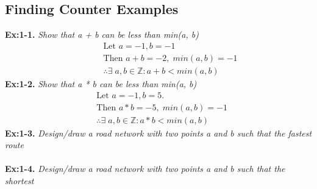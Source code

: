\subsection{Finding Counter Examples}
%
\begin{minipage}{.60\textwidth}
\textbf{\;\;Ex:1-1. } \emph{Show that a + b can be less than min(a, b)}
%
{\color{answer}{}
\begin{align*}
	&\qquad\text{Let } a = -1, b = -1 \\
	&\qquad\text{Then } a + b = -2, \; min(a,b) = -1 \\
	&\qquad\therefore \exists \; a, b \in \mathbb{Z} : a+b < min(a,b)
	\end{align*}
}
%
\textbf{Ex:1-2.} \emph{Show that a * b can be less than min(a, b)}
%
{\color{answer}{}
\begin{align*} 
	&\text{Let } a = -1, b = 5. \\
	&\text{Then } a*b = -5, \; min(a,b) = -1\\
	&\therefore \exists \; a, b \in \mathbb{Z} : a*b < min(a,b)
\end{align*}}
%
\textbf{Ex:1-3.} \emph{Design/draw a road network with two points a and b such that the fastest route} \newline{}
 \\
%
{\color{answer}{}
\begin{center}
\end{center}}
%
\paragraph{}
%
\textbf{Ex:1-4.} \emph{Design/draw a road network with two points a and b such that the shortest } \newline{}
 \\
%
{\color{answer}{}
\begin{center}
\end{center}}

\end{minipage}
